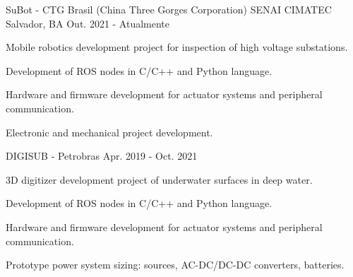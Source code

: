 

\begin{cventries}

  \cventry
    {SuBot - CTG Brasil (China Three Gorges Corporation)} %
    {SENAI CIMATEC} %
    {Salvador, BA} %
    {Out. 2021 - Atualmente} %
    {
      \begin{cvitems} %
        \item {Mobile robotics development project for inspection of high voltage substations.}
        \item {Development of ROS nodes in C/C++ and Python language.}
        \item {Hardware and firmware development for actuator systems and peripheral communication.}
        \item {Electronic and mechanical project development.}
      \end{cvitems}
    }


  \cventry
    {DIGISUB - Petrobras} %
    {} %
    {} %
    {Apr. 2019 - Oct. 2021} %
    {
      \begin{cvitems} %
        \item {3D digitizer development project of underwater surfaces in deep water.}
        \item {Development of ROS nodes in C/C++ and Python language.}
        \item {Hardware and firmware development for actuator systems and peripheral communication.}
        \item {Prototype power system sizing: sources, AC-DC/DC-DC converters, batteries.}
      \end{cvitems}
    }



\end{cventries}
